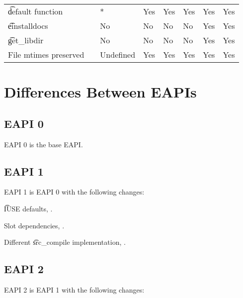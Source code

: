 \begin{landscape}
\begin{longtable}{llP{7.5em}P{7.5em}P{7.5em}P{7.5em}P{7.5em}P{7.5em}}
\t{default} function &  &
    * & Yes & Yes & Yes & Yes & Yes \\

\t{einstalldocs} &  &
    No & No & No & No & Yes & Yes \\

\t{get_libdir} &  &
    No & No & No & No & Yes & Yes \\

File mtimes preserved &  &
    Undefined & Yes & Yes & Yes & Yes & Yes \\

\end{longtable}
\end{landscape}

\chapter{Differences Between EAPIs}


\section{EAPI 0}

EAPI 0 is the base EAPI.

\section{EAPI 1}

EAPI 1 is EAPI 0 with the following changes:

\begin{compactitem}
\item \t{IUSE} defaults, .
\item Slot dependencies, .
\item Different \t{src_compile} implementation, .
\end{compactitem}

\section{EAPI 2}

EAPI 2 is EAPI 1 with the following changes:

